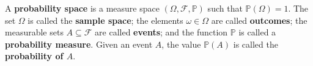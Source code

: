\todo{}

\begin{construction}
\label{cnsLebesgueMeasure}
\todo{}
\end{construction}

\todo{}

\begin{definition}
\label{defProbabilitySpace}
A \textbf{probability space} is a measure space $(\Omega, \mathcal{F}, \mathbb{P})$ such that $\mathbb{P}(\Omega) = 1$. The set $\Omega$ is called the \textbf{sample space}; the elements $\omega \in \Omega$ are called \textbf{outcomes}; the measurable sets $A \subseteq \mathcal{F}$ are called \textbf{events}; and the function $\mathbb{P}$ is called a \textbf{probability measure}. Given an event $A$, the value $\mathbb{P}(A)$ is called the \textbf{probability of $A$}.
\end{definition}

\todo{}